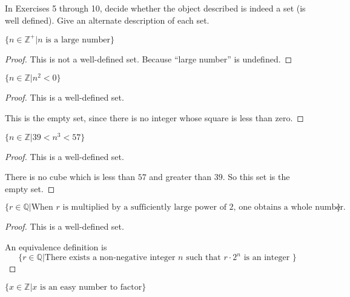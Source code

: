 In Exercises 5 through 10, decide whether the object described is indeed a set (is well defined). Give an alternate description of each set.

\newpage
\begin{exercise}
    $\{ n\in\mathbb{Z}^{+} \vert \text{$n$ is a large number} \}$
\end{exercise}

\begin{proof}
    This is not a well-defined set. Because ``large number'' is undefined.
\end{proof}

\newpage
\begin{exercise}
    $\{ n\in\mathbb{Z} \vert n^{2} < 0 \}$
\end{exercise}

\begin{proof}
    This is a well-defined set.

    This is the empty set, since there is no integer whose square is less than zero.
\end{proof}

\newpage
\begin{exercise}
    $\{ n\in\mathbb{Z} \vert 39 < n^{3} < 57 \}$
\end{exercise}

\begin{proof}
    This is a well-defined set.

    There is no cube which is less than $57$ and greater than $39$. So this set is the empty set.
\end{proof}

\newpage
\begin{exercise}
    $\{ r\in\mathbb{Q} \vert \text{When $r$ is multiplied by a sufficiently large power of $2$, one obtains a whole number.} \}$
\end{exercise}

\begin{proof}
    This is a well-defined set.

    An equivalence definition is
    \[
        \{ r\in\mathbb{Q} \vert \text{There exists a non-negative integer $n$ such that $r\cdot 2^{n}$ is an integer } \}
    \]
\end{proof}

\newpage
\begin{exercise}
    $\{ x\in\mathbb{Z} \vert \text{$x$ is an easy number to factor} \}$
\end{exercise}

